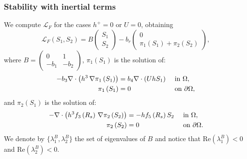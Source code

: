 \documentclass[10pt,aspectratio=169]{beamer}
\newenvironment{nalign}{
	\begin{equation}
	\begin{aligned}
}{
	\end{aligned}
	\end{equation}
	\ignorespacesafterend
}
\begin{document}
\begin{frame}
\frametitle{Stability with inertial terms}\vspace*{0.5cm}
We compute $\mathcal{L}_F$ for the cases $h^+=0$ or $U=0$, obtaining
\begin{equation}\label{eq:L_F}
\mathcal{L}_F\left(S_1,S_2\right)=B\begin{pmatrix}
S_1\\S_2
\end{pmatrix}-b_r\begin{pmatrix}
0\\\pi_1\left(S_1\right)+\pi_2\left(S_2\right)
\end{pmatrix},
\end{equation}
where $B=\begin{pmatrix}0&1\\-b_1&-b_2
\end{pmatrix}$, $\pi_1(S_1)$ is the solution of:
\begin{nalign}
	-b_3\nabla\cdot \left(h^3 \,\nabla \pi_1\left(S_1\right)\right)&=b_4\nabla\cdot \left(UhS_1\right)&&\textnormal{ in }  \Omega,\\
	\pi_1\left(S_1\right)&=0 &&\textnormal{ on } \partial \Omega,
	\label{eq:pi1-triv-case}
\end{nalign}
and $\pi_2(S_1)$ is the solution of:
\begin{nalign}
	-\nabla\cdot \left(h^3f_3\left(R_s\right) \,\nabla \pi_2\left(S_2\right)\right)&=-hf_5\left(R_s\right)S_2&&\textnormal{ in }  \Omega,\\
	\pi_2\left(S_2\right)&=0 &&\textnormal{ on } \partial \Omega.
	\label{eq:def:pi2}
\end{nalign}
We denote by $\{\lambda_1^B,\lambda_2^B\}$ the set of eigenvalues of $B$ and notice that $\mbox{Re}\left(\lambda_1^B\right)<0$ and $\mbox{Re}\left(\lambda_2^B\right)<0$.
\end{frame}

\end{document}
